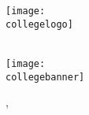 \begin{titlepage}
\begin{samepage}
\begin{center}
            \texttt{[image: \\collegelogo]}\vfill
            
            \\[0.2cm]
            \texttt{[image: \\collegebanner]}
            
            \normalfont \monthname, \the\year 
        \end{center}
    \end{samepage}
\end{titlepage}
